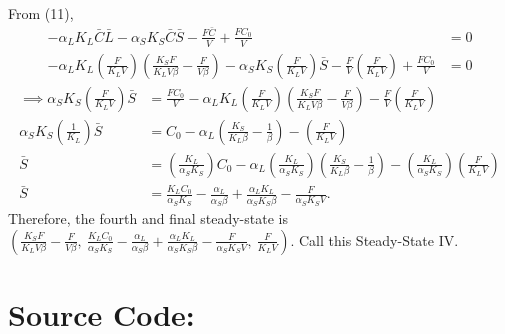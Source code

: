 \begin{enumerate}
    From (11), 
    \begin{align*}
      -\alpha_L K_L \bar{C}\bar{L} -\alpha_S K_S \bar{C}\bar{S} - \frac{F\bar{C}}{V} + \frac{FC_0}{V} &= 0 \\
      -\alpha_L K_L \left( \frac{F}{K_L V} \right) \left( \frac{K_S F}{K_L V \beta} - \frac{F}{V \beta} \right) -\alpha_S K_S \left( \frac{F}{K_L V} \right) \bar{S} - \frac{F}{V} \left( \frac{F}{K_L V} \right) + \frac{FC_0}{V} &= 0 
    \end{align*}
    \begin{align*}
      \implies \alpha_S K_S \left( \frac{F}{K_L V} \right) \bar{S} &=  \frac{FC_0}{V} - \alpha_L K_L \left( \frac{F}{K_L V} \right) \left( \frac{K_S F}{K_L V \beta} - \frac{F}{V \beta} \right) - \frac{F}{V} \left( \frac{F}{K_L V} \right) \\ 
      \alpha_S K_S \left( \frac{1}{K_L} \right) \bar{S} &=  C_0 - \alpha_L \left( \frac{K_S}{K_L \beta} - \frac{1}{\beta} \right) - \left( \frac{F}{K_L V} \right) \\ 
      \bar{S} &= \left( \frac{K_L}{\alpha_S K_S} \right) C_0 - \alpha_L \left( \frac{K_L}{\alpha_S K_S} \right) \left( \frac{K_S}{K_L \beta} - \frac{1}{\beta} \right) - \left( \frac{K_L}{\alpha_S K_S} \right) \left( \frac{F}{K_L V} \right) \\ 
      \bar{S} &= \frac{K_L C_0}{\alpha_S K_S} - \frac{\alpha_L}{\alpha_S \beta} + \frac{\alpha_L K_L}{\alpha_S K_S \beta} - \frac{F}{\alpha_S K_S V}.
    \end{align*}
    Therefore, the fourth and final steady-state is {\color{red}$\left(\frac{K_S F}{K_L V \beta} - \frac{F}{V \beta},\ \frac{K_L C_0}{\alpha_S K_S} - \frac{\alpha_L}{\alpha_S \beta} + \frac{\alpha_L K_L}{\alpha_S K_S \beta} - \frac{F}{\alpha_S K_S V},\ \frac{F}{K_L V} \right)$}.  Call this {\color{red}Steady-State IV}. 
  \end{enumerate}

\section*{Source Code:}





